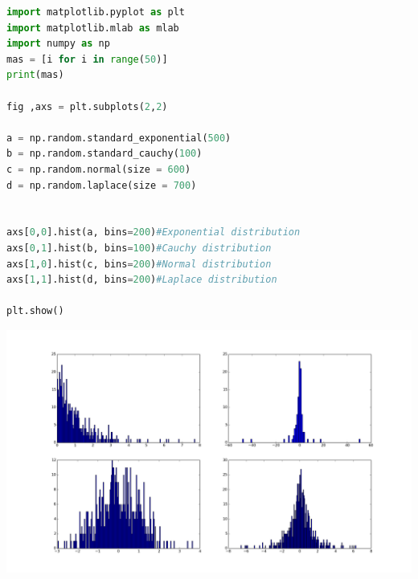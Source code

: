\documentclass[a4paper,12pt]{article}
\begin{document}
\begin{lstlisting}[language=Python]
import matplotlib.pyplot as plt
import matplotlib.mlab as mlab
import numpy as np
mas = [i for i in range(50)]
print(mas)

fig ,axs = plt.subplots(2,2)

a = np.random.standard_exponential(500)
b = np.random.standard_cauchy(100)
c = np.random.normal(size = 600)
d = np.random.laplace(size = 700)


axs[0,0].hist(a, bins=200)#Exponential distribution
axs[0,1].hist(b, bins=100)#Cauchy distribution
axs[1,0].hist(c, bins=200)#Normal distribution
axs[1,1].hist(d, bins=200)#Laplace distribution

plt.show()

\end{lstlisting}


\includegraphics[trim=3cm 0 0 -0.5cm, height = 16 cm, width =  19 cm]{gistogrammb.png}
\end{document}
